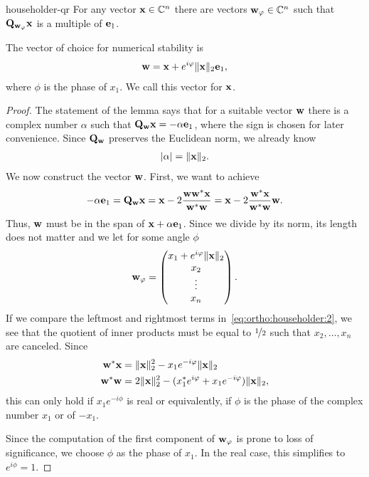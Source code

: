 \begin{Lemma}{householder-qr}
  For any vector $\mathbf x\in\mathbb C^n$ there are vectors $\mathbf w_\varphi\in\mathbb C^n$ such
  that $\mathbf Q_{\mathbf w_\varphi} \mathbf x$ is a multiple of $\mathbf e_1$.

  The vector of choice for numerical stability is
  \begin{gather}
    \label{eq:ortho:householder:1}
    \mathbf w = \mathbf x + e^{i\varphi} \lVert\mathbf x\rVert_2\mathbf e_1,
  \end{gather}
  where $\phi$ is the phase of $x_1$. We call this vector  for $\mathbf x$.
\end{Lemma}

\begin{proof}
  The statement of the lemma says that for a suitable vector $\mathbf w$
  there is a complex number $\alpha$ such that
  $\mathbf Q_{\mathbf w} \mathbf x = -\alpha \mathbf e_1$, where the sign is chosen for
  later convenience. Since $\mathbf Q_{\mathbf w}$ preserves the Euclidean norm,
  we already know
  \begin{gather}
    \lvert\alpha\rvert = \lVert\mathbf x\rVert_2.
  \end{gather}
  We now construct the vector $\mathbf w$. First, we want to achieve
  \begin{gather}
    \label{eq:ortho:householder:2}
    -\alpha\mathbf e_1 = \mathbf Q_{\mathbf w} \mathbf x
    = \mathbf x - 2 \frac{\mathbf w\mathbf w^*\mathbf x}{\mathbf w^*\mathbf w}
    = \mathbf x - 2 \frac{\mathbf w^*\mathbf x}{\mathbf w^*\mathbf w}\mathbf w.
  \end{gather}
  Thus, $\mathbf w$ must be in the span of $\mathbf x+\alpha \mathbf e_1$. Since we divide by
  its norm, its length does not matter and we let for some angle $\phi$
  \begin{gather}
    \mathbf w_\varphi =
    \begin{pmatrix}
      x_1 + e^{i\varphi} \lVert\mathbf x\rVert_2\\x_2\\\vdots\\x_n
    \end{pmatrix}.
  \end{gather}
  If we compare the leftmost and rightmost terms
  in~\eqref{eq:ortho:householder:2}, we see that the quotient of inner
  products must be equal to $\nicefrac12$ such that $x_2,\dots,x_n$
  are canceled. Since
  \begin{align}
    \mathbf w^*\mathbf x &= \lVert\mathbf x\rVert_2^2 - x_1 e^{-i\varphi} \lVert\mathbf x\rVert_2
    \\
    \mathbf w^*\mathbf w &= 2\lVert\mathbf x\rVert_2^2 - (x_1^*e^{i\varphi} + x_1 e^{-i\varphi})\lVert\mathbf x\rVert_2,
  \end{align}
  this can only hold if $x_1 e^{-i\phi}$ is real or equivalently, if
  $\phi$ is the phase of the complex number $x_1$ or of $-x_1$.

  Since the computation of the first component of $\mathbf w_\varphi$ is prone
  to loss of significance, we choose $\phi$ as the phase of $x_1$. In
  the real case, this simplifies to $e^{i\phi} = 1$.
\end{proof}

